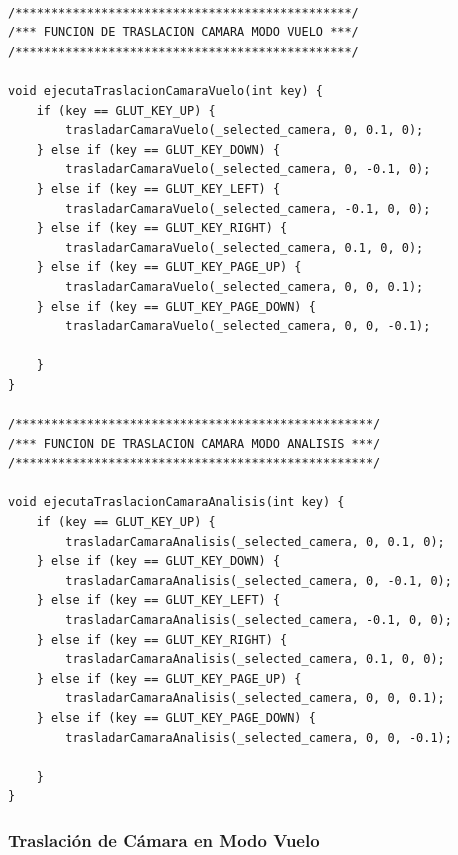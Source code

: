 \documentclass[12pt,a4paper]{article}
\begin{document}
\begin{lstlisting}

/***********************************************/
/*** FUNCION DE TRASLACION CAMARA MODO VUELO ***/
/***********************************************/

void ejecutaTraslacionCamaraVuelo(int key) {
    if (key == GLUT_KEY_UP) {
        trasladarCamaraVuelo(_selected_camera, 0, 0.1, 0);
    } else if (key == GLUT_KEY_DOWN) {
        trasladarCamaraVuelo(_selected_camera, 0, -0.1, 0);
    } else if (key == GLUT_KEY_LEFT) {
        trasladarCamaraVuelo(_selected_camera, -0.1, 0, 0);
    } else if (key == GLUT_KEY_RIGHT) {
        trasladarCamaraVuelo(_selected_camera, 0.1, 0, 0);
    } else if (key == GLUT_KEY_PAGE_UP) {
        trasladarCamaraVuelo(_selected_camera, 0, 0, 0.1);
    } else if (key == GLUT_KEY_PAGE_DOWN) {
        trasladarCamaraVuelo(_selected_camera, 0, 0, -0.1);

    }
}

/**************************************************/
/*** FUNCION DE TRASLACION CAMARA MODO ANALISIS ***/
/**************************************************/

void ejecutaTraslacionCamaraAnalisis(int key) {
    if (key == GLUT_KEY_UP) {
        trasladarCamaraAnalisis(_selected_camera, 0, 0.1, 0);
    } else if (key == GLUT_KEY_DOWN) {
        trasladarCamaraAnalisis(_selected_camera, 0, -0.1, 0);
    } else if (key == GLUT_KEY_LEFT) {
        trasladarCamaraAnalisis(_selected_camera, -0.1, 0, 0);
    } else if (key == GLUT_KEY_RIGHT) {
        trasladarCamaraAnalisis(_selected_camera, 0.1, 0, 0);
    } else if (key == GLUT_KEY_PAGE_UP) {
        trasladarCamaraAnalisis(_selected_camera, 0, 0, 0.1);
    } else if (key == GLUT_KEY_PAGE_DOWN) {
        trasladarCamaraAnalisis(_selected_camera, 0, 0, -0.1);

    }
}

\end{lstlisting}

\subsubsection{Traslación de Cámara en Modo Vuelo}
\end{document}
